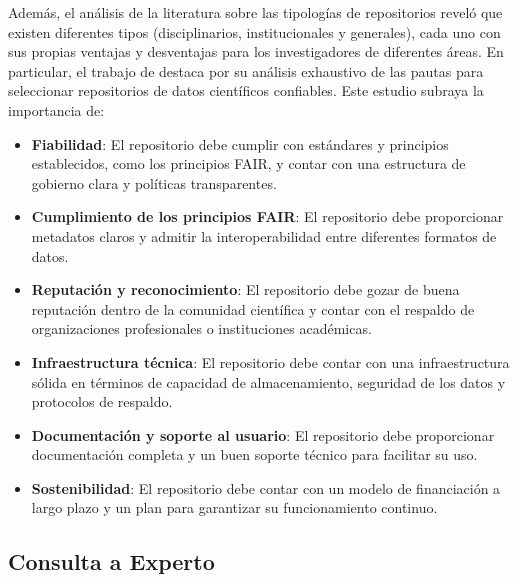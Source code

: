 \documentclass[runningheads]{llncs}
\begin{document}
Además, el análisis de la literatura sobre las tipologías de repositorios reveló que existen diferentes tipos (disciplinarios, institucionales y generales), cada uno con sus propias ventajas y desventajas para los investigadores de diferentes áreas.
En particular, el trabajo de \cite{Jiang2023GlobalRepo} destaca por su análisis exhaustivo de las pautas para seleccionar repositorios de datos científicos confiables. Este estudio subraya la importancia de:
\begin{itemize}
    \item \textbf{Fiabilidad}: El repositorio debe cumplir con estándares y principios establecidos, como los principios FAIR, y contar con una estructura de gobierno clara y políticas transparentes.
    \item \textbf{Cumplimiento de los principios FAIR}: El repositorio debe proporcionar metadatos claros y admitir la interoperabilidad entre diferentes formatos de datos.
    \item \textbf{Reputación y reconocimiento}: El repositorio debe gozar de buena reputación dentro de la comunidad científica y contar con el respaldo de organizaciones profesionales o instituciones académicas.
    \item \textbf{Infraestructura técnica}: El repositorio debe contar con una infraestructura sólida en términos de capacidad de almacenamiento, seguridad de los datos y protocolos de respaldo.
    \item \textbf{Documentación y soporte al usuario}: El repositorio debe proporcionar documentación completa y un buen soporte técnico para facilitar su uso.
    \item \textbf{Sostenibilidad}: El repositorio debe contar con un modelo de financiación a largo plazo y un plan para garantizar su funcionamiento continuo.
\end{itemize}

\subsection{Consulta a Experto}
\end{document}
